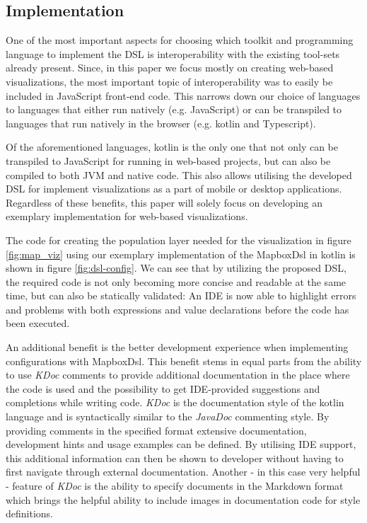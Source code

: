 \documentclass[conference]{IEEEtran}
\begin{document}
\subsection{Implementation}
One of the most important aspects for choosing which toolkit and programming language to implement the DSL is interoperability with the existing tool-sets already present. Since, in this paper we focus mostly on creating web-based visualizations, the most important topic of interoperability was to easily be included in JavaScript front-end code. This narrows down our choice of languages to languages that either run natively (e.g. JavaScript) or can be transpiled to languages that run natively in the browser (e.g. kotlin and Typescript).

Of the aforementioned languages, kotlin is the only one that not only can be transpiled to JavaScript for running in web-based projects, but can also be compiled to both JVM and native code. This also allows utilising the developed DSL for implement visualizations as a part of mobile or desktop applications. Regardless of these benefits, this paper will solely focus on developing an exemplary implementation for web-based visualizations.

The code for creating the population layer needed for the visualization in figure \ref{fig:map_viz} using our exemplary implementation of the MapboxDsl in kotlin is shown in figure \ref{fig:dsl-config}. We can see that by utilizing the proposed DSL, the required code is not only becoming more concise and readable at the same time, but can also be statically validated: An IDE is now able to highlight errors and problems with both expressions and value declarations before the code has been executed.

An additional benefit is the better development experience when implementing configurations with MapboxDsl. This benefit stems in equal parts from the ability to use \textit{KDoc} comments to provide additional documentation in the place where the code is used and the possibility to get IDE-provided suggestions and completions while writing code. \textit{KDoc} is the documentation style of the kotlin language and is syntactically similar to the \textit{JavaDoc} commenting style. 
By providing comments in the specified format extensive documentation, development hints and usage examples can be defined. By utilising IDE support, this additional information can then be shown to developer without having to first navigate through external documentation. Another - in this case very helpful - feature of \textit{KDoc} is the ability to specify documents in the Markdown format which brings the helpful ability to include images in documentation code for  style definitions.
\end{document}
